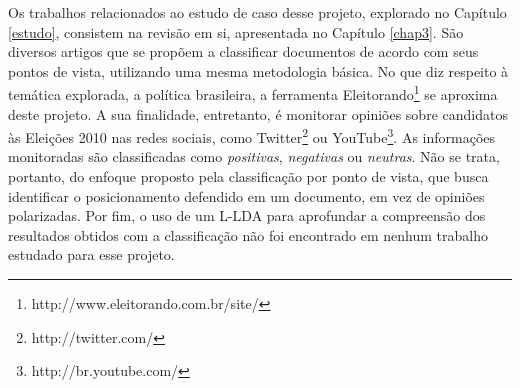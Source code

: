 Os trabalhos relacionados ao estudo de caso desse projeto, explorado no Capítulo \ref{estudo}, consistem na revisão em si, apresentada no Capítulo \ref{chap3}. São diversos artigos que se propõem a classificar documentos de acordo com seus pontos de vista, utilizando uma mesma metodologia básica. No que diz respeito à temática explorada, a política brasileira, a ferramenta Eleitorando\footnote{http://www.eleitorando.com.br/site/} se aproxima deste projeto. A sua finalidade, entretanto, é monitorar opiniões sobre candidatos às Eleições 2010 nas redes sociais, como Twitter\footnote{http://twitter.com/} ou YouTube\footnote{http://br.youtube.com/}. As informações monitoradas são classificadas como \emph{positivas}, \emph{negativas} ou \emph{neutras}. Não se trata, portanto, do enfoque proposto pela classificação por ponto de vista, que busca identificar o posicionamento defendido em um documento, em vez de opiniões polarizadas. Por fim, o uso de um L-LDA para aprofundar a compreensão dos resultados obtidos com a classificação não foi encontrado em nenhum trabalho estudado para esse projeto.     
